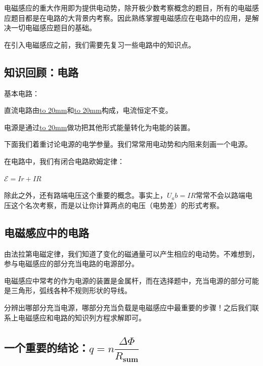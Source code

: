 \documentclass{ctexbook}
\begin{document}
	电磁感应的重大作用即为提供电动势，除开极少数考察概念的题目，所有的电磁感应题目都是在电路的大背景内考察。因此熟练掌握电磁感应在电路中的应用，是解决一切电磁感应题目的基础。
	
	在引入电磁感应之前，我们需要先复习一些电路中的知识点。
	
	\subsection{知识回顾：电路}
	
	基本电路：
	
	\hspace*{\fill}
	
	\hspace*{\fill}
	
	\hspace*{\fill}
	
	\hspace*{\fill}
	
	\hspace*{\fill}
	
	直流电路由\underline{\hbox to 20mm{}}和\underline{\hbox to 20mm{}}构成，电流恒定不变。
	
	电源是通过\underline{\hbox to 20mm{}}做功把其他形式能量转化为电能的装置。
	
	下面我们着重讨论电源的电学参量。我们常常用电动势和内阻来刻画一个电源。
	
	在电路中，我们有闭合电路欧姆定律：
	
	\centerline{$\mathcal{E}=Ir+IR$}
	
	除此之外，还有路端电压这个重要的概念。事实上，$U_ab=IR$常常不会以路端电压这个名次考察，而是以让你计算两点的电压（电势差）的形式考察。
	
	\subsection{电磁感应中的电路}
	由法拉第电磁定律，我们知道了变化的磁通量可以产生相应的电动势。不难想到，参与电磁感应的部分充当电路的电源部分。
	
	电磁感应中常考的作为电源的装置是金属杆，而在选择题中，充当电源的部分可能是三角形，弧线各种不规则形状的导线。
	
	分辨出哪部分充当电源，哪部分充当负载是电磁感应中最重要的步骤！之后我们联系上电磁感应和电路的知识列方程求解即可。
	
	\subsection{一个重要的结论：$q=n\dfrac{\Delta \varPhi}{R_{\mathbf{sum}}}$}
	
\end{document}
